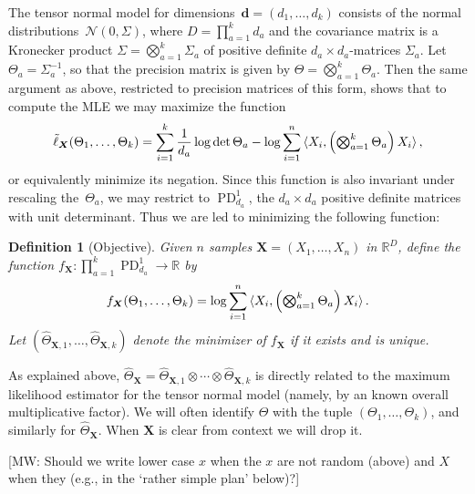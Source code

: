 \documentclass{article}
\newtheorem{definition}{Definition}
\newcommand{\R}{{\mathbb{R}}}
\newcommand{\ot}{\otimes}
\renewcommand{\vec}{\bm}
\newcommand\cN{\mathcal{N}}
\newcommand\PD{\operatorname{PD}}
\newcommand{\MW}[1]{{\color{red}[MW: #1]}}
\begin{document}
The tensor normal model for dimensions~$\vec d=(d_1,\dots,d_k)$ consists of the normal distributions~$\cN(0,\Sigma)$, where $D = \prod_{a=1}^k d_a$ and the covariance matrix is a Kronecker product $\Sigma = \bigotimes_{a=1}^k \Sigma_a$ of positive definite $d_a\times d_a$-matrices $\Sigma_a$.
Let $\Theta_a = \Sigma_a^{-1}$, so that the precision matrix is given by $\Theta = \bigotimes_{a=1}^k \Theta_a$.
Then the same argument as above, restricted to precision matrices of this form, shows that to compute the MLE we may maximize the function
\begin{align*}
  \tilde\ell_{\vec X}(\Theta_1,\dots,\Theta_k) = \sum_{i=1}^k \frac1{d_a} \log \det \Theta_a - \log \sum_{i=1}^n \braket{X_i, \left( \textstyle \bigotimes_{a=1}^k \Theta_a \right) X_i},
\end{align*}
or equivalently minimize its negation.
Since this function is also invariant under rescaling the~$\Theta_a$, we may restrict to $\PD_{d_a}^1$, the $d_a\times d_a$ positive definite matrices with unit determinant.
Thus we are led to minimizing the following function:

\begin{definition}[Objective]\label{dfn:function}
Given $n$ samples $\vec{X} = (X_1, \dots, X_n)$ in $\R^D$, define the function $f_{\vec X}\colon\prod_{a=1}^k \PD_{d_a}^1 \to \R$ by
\begin{align}\label{eq:projective-likelihood}
  f_{\vec X}(\Theta_1,\dots,\Theta_k) = \log \sum_{i=1}^n \braket{X_i, \left( \textstyle \bigotimes_{a=1}^k \Theta_a \right) X_i}.
\end{align}
Let $(\widehat{\Theta}_{\vec X,1}, \dots, \widehat{\Theta}_{\vec X,k})$ denote the minimizer of $f_{\vec X}$ if it exists and is unique.
\end{definition}

\noindent
As explained above, $\widehat{\Theta}_{\vec X} = \widehat{\Theta}_{\vec X,1} \ot \cdots \ot \widehat{\Theta}_{\vec X,k}$ is directly related to the maximum likelihood estimator for the tensor normal model (namely, by an known overall multiplicative factor).
We will often identify $\Theta$ with the tuple $(\Theta_1,\dots,\Theta_k)$, and similarly for $\widehat{\Theta}_{\vec X}$.
When $\vec X$ is clear from context we will drop it.

\MW{Should we write lower case $x$ when the $x$ are not random (above) and $X$ when they (e.g., in the `rather simple plan' below)?}

\end{document}
